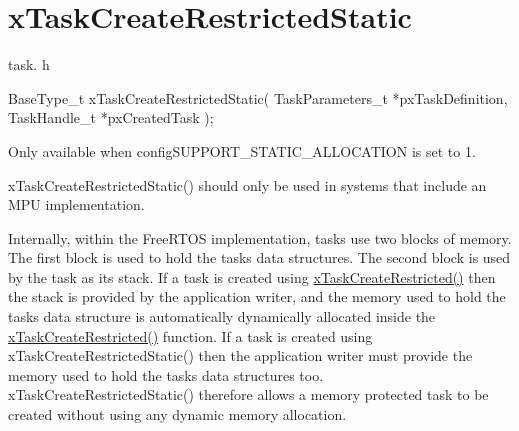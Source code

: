 \hypertarget{group__x_task_create_restricted_static}{}\section{x\+Task\+Create\+Restricted\+Static}
\label{group__x_task_create_restricted_static}
task. h 
\begin{DoxyPre}
BaseType\_t xTaskCreateRestrictedStatic( TaskParameters\_t *pxTaskDefinition, TaskHandle\_t *pxCreatedTask );
\end{DoxyPre}


Only available when config\+S\+U\+P\+P\+O\+R\+T\+\_\+\+S\+T\+A\+T\+I\+C\+\_\+\+A\+L\+L\+O\+C\+A\+T\+I\+ON is set to 1.

x\+Task\+Create\+Restricted\+Static() should only be used in systems that include an M\+PU implementation.

Internally, within the Free\+R\+T\+OS implementation, tasks use two blocks of memory. The first block is used to hold the task\textquotesingle{}s data structures. The second block is used by the task as its stack. If a task is created using \hyperlink{vendor_2ceedling_2plugins_2freertos_2src_2freertos_2include_2task_8h_a61b00cd623953f4f94fe794057d7f648}{x\+Task\+Create\+Restricted()} then the stack is provided by the application writer, and the memory used to hold the task\textquotesingle{}s data structure is automatically dynamically allocated inside the \hyperlink{vendor_2ceedling_2plugins_2freertos_2src_2freertos_2include_2task_8h_a61b00cd623953f4f94fe794057d7f648}{x\+Task\+Create\+Restricted()} function. If a task is created using x\+Task\+Create\+Restricted\+Static() then the application writer must provide the memory used to hold the task\textquotesingle{}s data structures too. x\+Task\+Create\+Restricted\+Static() therefore allows a memory protected task to be created without using any dynamic memory allocation.



